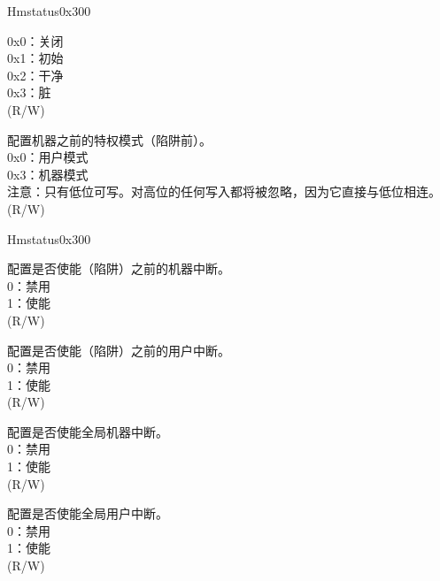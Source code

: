 \begin{register}{H}{mstatus}{0x300}
\begin{regdesc}
\begin{reglist}
0x0：关闭\\
0x1：初始\\
0x2：干净\\
0x3：脏\\
(R/W)
\label{fielddesc:MSTATUSMPP}\item [MPP] 配置机器之前的特权模式（陷阱前）。\\
0x0：用户模式\\
0x3：机器模式\\
注意：只有低位可写。对高位的任何写入都将被忽略，因为它直接与低位相连。\\
(R/W)
\item [见下页……]
\end{reglist}\end{regdesc}
\end{register}
\addtocounter{Regfloat}{-1}
\begin{register}{H}{mstatus}{0x300}
\begin{regdesc}\begin{reglist}
\item [接上页……]
\label{fielddesc:MSTATUSMPIE}\item [MPIE] 配置是否使能（陷阱）之前的机器中断。\\
0：禁用\\
1：使能\\
(R/W)
\label{fielddesc:MSTATUSUPIE}\item [UPIE] 配置是否使能（陷阱）之前的用户中断。\\
0：禁用\\
1：使能\\
(R/W)
\label{fielddesc:MSTATUSMIE}\item [MIE] 配置是否使能全局机器中断。\\
0：禁用\\
1：使能\\
(R/W)
\label{fielddesc:MSTATUSUIE}\item [UIE] 配置是否使能全局用户中断。\\
0：禁用\\
1：使能\\
(R/W)
\end{reglist}\end{regdesc}
\end{register}

